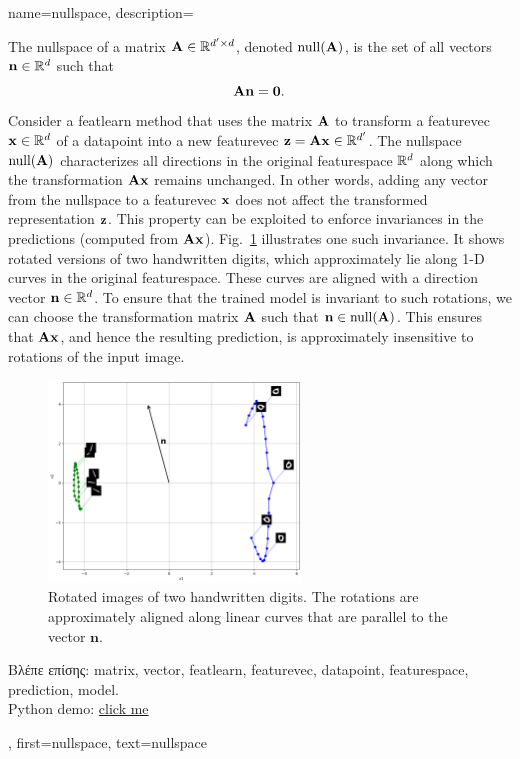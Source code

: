 {name={nullspace},
	description={The nullspace of a \gls{matrix} ${\bf A} \in \mathbb{R}^{d' \times d}$, 
		denoted ${\rm null}({\bf A})$, is the set of all \gls{vector}s $\mathbf{n} \in \mathbb{R}^d$ 
    		such that $${\bf A} \mathbf{n} = \mathbf{0}.$$ 
		Consider a \gls{featlearn} method that uses the \gls{matrix} ${\bf A}$ to transform 
		a \gls{featurevec} $\mathbf{x} \in \mathbb{R}^{d}$ of a \gls{datapoint} 
		into a new \gls{featurevec} ${\bf z} = {\bf A} \mathbf{x} \in \mathbb{R}^{d'}$. 
		The nullspace ${\rm null}({\bf A})$ characterizes all directions in the original 
    		\gls{featurespace} $\mathbb{R}^{d}$ along which the transformation 
		${\bf A} \mathbf{x}$ remains unchanged. In other words, adding any \gls{vector} from 
		the nullspace to a \gls{featurevec} ${\bf x}$ does not affect the transformed 
		representation ${\bf z}$. This property can be exploited to enforce invariances in the 
		\gls{prediction}s (computed from ${\bf A} \mathbf{x}$). Fig.\ \ref{fig:nullspace-rotation-dict} 
		illustrates one such invariance. It shows rotated versions of two handwritten digits, 
		which approximately lie along 1-D curves in the original \gls{featurespace}. 
		These curves are aligned with a direction \gls{vector} $\mathbf{n} \in \mathbb{R}^{d}$. 
    		To ensure that the trained \gls{model} is invariant to such rotations, we can 
		choose the transformation \gls{matrix} ${\bf A}$ such that $\mathbf{n} \in {\rm null}({\bf A})$. 
		This ensures that ${\bf A} \mathbf{x}$, and hence the resulting \gls{prediction}, 
		is approximately insensitive to rotations of the input image.
		\begin{figure}[H]
      			\centering
      			\includegraphics[width=0.6\textwidth]{assets/pythonsnacks/nullspace_0_1.png}
	  		\caption{Rotated images of two handwritten digits. The rotations are approximately 
	  		aligned along linear curves that are parallel to the \gls{vector} $\mathbf{n}$.\label{fig:nullspace-rotation-dict}}	
	       	\end{figure}
		\foreignlanguage{greek}{Βλέπε επίσης:} \gls{matrix}, \gls{vector}, \gls{featlearn}, \gls{featurevec}, \gls{datapoint}, \gls{featurespace}, 
		\gls{prediction}, \gls{model}. \\ 
		Python demo: \href{https://github.com/AaltoDictionaryofML/AaltoDictionaryofML.github.io/blob/main/assets/pythonsnacks/nullspace.py}{click me}},
 	first={nullspace},
 	text={nullspace}
}


